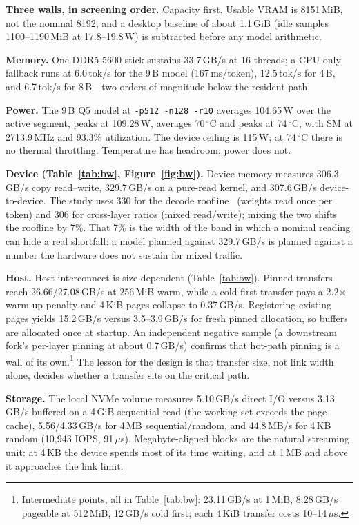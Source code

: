 \documentclass[letterpaper,twocolumn,10pt]{article}
\begin{document}
\textbf{Three walls, in screening order.} Capacity first. Usable VRAM is
8151\,MiB, not the nominal 8192, and a desktop baseline of about 1.1\,GiB (idle
samples 1100--1190\,MiB at 17.8--19.8\,W) is subtracted before any model
arithmetic.

\textbf{Memory.} One DDR5-5600 stick sustains 33.7\,GB/s at 16 threads; a
CPU-only fallback runs at 6.0\,tok/s for the 9\,B model (167\,ms/token),
12.5\,tok/s for 4\,B, and 6.7\,tok/s for 8\,B---two orders of magnitude below
the resident path.

\textbf{Power.} The 9\,B Q5 model at \texttt{-p512 -n128 -r10} averages
104.65\,W over the active segment, peaks at 109.28\,W, averages 70\,$^\circ$C
and peaks at 74\,$^\circ$C, with SM at 2713.9\,MHz and 93.3\% utilization. The
device ceiling is 115\,W; at 74\,$^\circ$C there is no thermal throttling.
Temperature has headroom; power does not.

\textbf{Device (Table~\ref{tab:bw}, Figure~\ref{fig:bw}).} Device memory
measures 306.3\,GB/s copy read--write, 329.7\,GB/s on a pure-read kernel, and
307.6\,GB/s device-to-device. The study uses 330 for the decode
roofline~\cite{williams2009} (weights read once per token) and 306 for
cross-layer ratios (mixed read/write); mixing the two shifts the roofline by
7\%. That 7\% is the width of the band in which a nominal reading can hide a
real shortfall: a model planned against 329.7\,GB/s is planned against a
number the hardware does not sustain for mixed traffic.

\textbf{Host.} Host interconnect is size-dependent (Table~\ref{tab:bw}).
Pinned transfers reach 26.66/27.08\,GB/s at 256\,MiB warm, while a cold first
transfer pays a 2.2$\times$ warm-up penalty and 4\,KiB pages collapse to
0.37\,GB/s. Registering existing pages yields 15.2\,GB/s versus 3.5--3.9\,GB/s
for fresh pinned allocation, so buffers are allocated once at startup. An
independent negative sample (a downstream fork's per-layer pinning at about
0.7\,GB/s) confirms that hot-path pinning is a wall of its own.\footnote{%
Intermediate points, all in Table~\ref{tab:bw}: 23.11\,GB/s at 1\,MiB,
8.28\,GB/s pageable at 512\,MiB, 12\,GB/s cold first; each 4\,KiB transfer
costs 10--14\,$\mu$s.} The lesson for the design is that transfer size, not
link width alone, decides whether a transfer sits on the critical path.

\textbf{Storage.} The local NVMe volume measures 5.10\,GB/s direct I/O versus
3.13\,GB/s buffered on a 4\,GiB sequential read (the working set exceeds the
page cache), 5.56/4.33\,GB/s for 4\,MB sequential/random, and 44.8\,MB/s for
4\,KB random (10{,}943 IOPS, 91\,$\mu$s). Megabyte-aligned blocks are the
natural streaming unit: at 4\,KB the device spends most of its time waiting,
and at 1\,MB and above it approaches the link limit.
\end{document}
